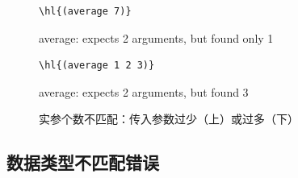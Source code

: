 \begin{figure}[htbp]
  \centering
\begin{stepperbox}[unbreakable]
\noindent\begin{minipage}[c]{0.46\linewidth}
\begin{Verbatim}[commandchars=\\\{\}, fontsize=\footnotesize]
\hl{(average 7)}
\end{Verbatim}
\end{minipage}\hfill
\begin{minipage}[c]{0.50\linewidth}\footnotesize\sffamily\raggedright
average: expects 2 arguments, but found only 1
\end{minipage}
\end{stepperbox}
\begin{stepperbox}[unbreakable]
\noindent\begin{minipage}[c]{0.46\linewidth}
\begin{Verbatim}[commandchars=\\\{\}, fontsize=\footnotesize]
\hl{(average 1 2 3)}
\end{Verbatim}
\end{minipage}\hfill
\begin{minipage}[c]{0.50\linewidth}\footnotesize\sffamily\raggedright
average: expects 2 arguments, but found 3
\end{minipage}
\end{stepperbox}
  \caption{实参个数不匹配：传入参数过少（上）或过多（下）}
  \label{fig:err_arg_mismatch}
\end{figure}

\subsection{数据类型不匹配错误}

